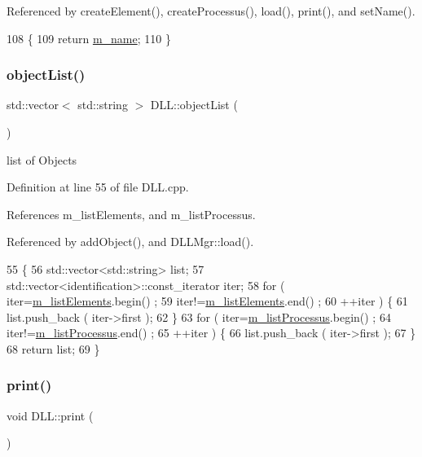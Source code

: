Referenced by create\+Element(), create\+Processus(), load(), print(), and set\+Name().


\begin{DoxyCode}
108                     \{
109     \textcolor{keywordflow}{return} \hyperlink{classDLL_ad5e4d36d8c2575447f73acc2a703b405}{m\_name};
110   \}
\end{DoxyCode}
\mbox{\label{classDLL_a7d378e5aceb5b06e0fd7df6bc07f9ee5}} 
\subsubsection{\texorpdfstring{object\+List()}{objectList()}}
{\footnotesize\ttfamily std\+::vector$<$ std\+::string $>$ D\+L\+L\+::object\+List (\begin{DoxyParamCaption}{ }\end{DoxyParamCaption})}

list of Objects 

Definition at line 55 of file D\+L\+L.\+cpp.



References m\+\_\+list\+Elements, and m\+\_\+list\+Processus.



Referenced by add\+Object(), and D\+L\+L\+Mgr\+::load().


\begin{DoxyCode}
55                                        \{
56   std::vector<std::string> list;
57   std::vector<identification>::const\_iterator iter;
58   \textcolor{keywordflow}{for} ( iter=\hyperlink{classDLL_a2e88d7167245fd7b6a000817583643ed}{m\_listElements}.begin() ;
59         iter!=\hyperlink{classDLL_a2e88d7167245fd7b6a000817583643ed}{m\_listElements}.end() ;
60         ++iter ) \{
61     list.push\_back ( iter->first );
62   \}
63   \textcolor{keywordflow}{for} ( iter=\hyperlink{classDLL_a197e92b990184a27a74f4a0456897bd5}{m\_listProcessus}.begin() ;
64         iter!=\hyperlink{classDLL_a197e92b990184a27a74f4a0456897bd5}{m\_listProcessus}.end() ;
65         ++iter ) \{
66     list.push\_back ( iter->first );
67   \}
68   \textcolor{keywordflow}{return} list;
69 \}
\end{DoxyCode}
\mbox{\label{classDLL_ae45f8b4b291e9da806f4921dd7468cfc}} 
\subsubsection{\texorpdfstring{print()}{print()}}
{\footnotesize\ttfamily void D\+L\+L\+::print (\begin{DoxyParamCaption}{ }\end{DoxyParamCaption})}

